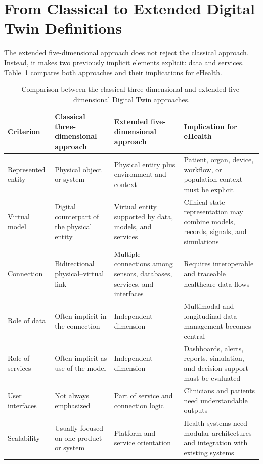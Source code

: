 \section{From Classical to Extended Digital Twin Definitions}
The extended five-dimensional approach does not reject the classical approach. Instead, it makes two previously implicit elements explicit: data and services. Table~\ref{tab:classical_extended_comparison} compares both approaches and their implications for eHealth.

\begin{table}[H]
\centering
\small
\caption{Comparison between the classical three-dimensional and extended five-dimensional Digital Twin approaches.}
\label{tab:classical_extended_comparison}
\begin{tabularx}{\textwidth}{>{\RaggedRight\arraybackslash}p{3.0cm} >{\RaggedRight\arraybackslash}p{3.8cm} >{\RaggedRight\arraybackslash}p{4.0cm} >{\RaggedRight\arraybackslash}X}
\toprule
\textbf{Criterion} & \textbf{Classical three-dimensional approach} & \textbf{Extended five-dimensional approach} & \textbf{Implication for eHealth}\\
\midrule
Represented entity & Physical object or system & Physical entity plus environment and context & Patient, organ, device, workflow, or population context must be explicit\\
Virtual model & Digital counterpart of the physical entity & Virtual entity supported by data, models, and services & Clinical state representation may combine models, records, signals, and simulations\\
Connection & Bidirectional physical--virtual link & Multiple connections among sensors, databases, services, and interfaces & Requires interoperable and traceable healthcare data flows\\
Role of data & Often implicit in the connection & Independent dimension & Multimodal and longitudinal data management becomes central\\
Role of services & Often implicit as use of the model & Independent dimension & Dashboards, alerts, reports, simulation, and decision support must be evaluated\\
User interfaces & Not always emphasized & Part of service and connection logic & Clinicians and patients need understandable outputs\\
Scalability & Usually focused on one product or system & Platform and service orientation & Health systems need modular architectures and integration with existing systems\\

\end{tabularx}
\end{table}
